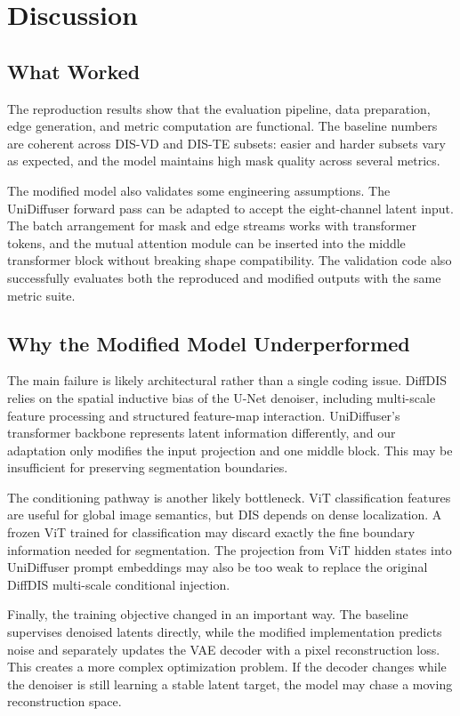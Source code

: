 \documentclass[sigconf,nonacm]{acmart}
\begin{document}
\section{Discussion}
\subsection{What Worked}
The reproduction results show that the evaluation pipeline, data preparation, edge generation, and metric computation are functional. The baseline numbers are coherent across DIS-VD and DIS-TE subsets: easier and harder subsets vary as expected, and the model maintains high mask quality across several metrics.

The modified model also validates some engineering assumptions. The UniDiffuser forward pass can be adapted to accept the eight-channel latent input. The batch arrangement for mask and edge streams works with transformer tokens, and the mutual attention module can be inserted into the middle transformer block without breaking shape compatibility. The validation code also successfully evaluates both the reproduced and modified outputs with the same metric suite.

\subsection{Why the Modified Model Underperformed}
The main failure is likely architectural rather than a single coding issue. DiffDIS relies on the spatial inductive bias of the U-Net denoiser, including multi-scale feature processing and structured feature-map interaction. UniDiffuser's transformer backbone represents latent information differently, and our adaptation only modifies the input projection and one middle block. This may be insufficient for preserving segmentation boundaries.

The conditioning pathway is another likely bottleneck. ViT classification features are useful for global image semantics, but DIS depends on dense localization. A frozen ViT trained for classification may discard exactly the fine boundary information needed for segmentation. The projection from ViT hidden states into UniDiffuser prompt embeddings may also be too weak to replace the original DiffDIS multi-scale conditional injection.

Finally, the training objective changed in an important way. The baseline supervises denoised latents directly, while the modified implementation predicts noise and separately updates the VAE decoder with a pixel reconstruction loss. This creates a more complex optimization problem. If the decoder changes while the denoiser is still learning a stable latent target, the model may chase a moving reconstruction space.
\end{document}
